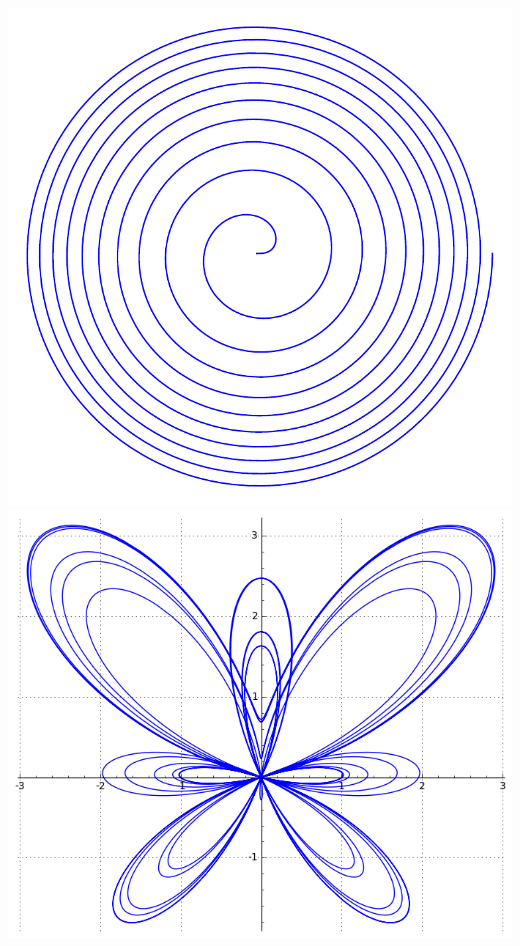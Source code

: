 \documentclass[class=report,crop=false]{standalone}
\begin{document}
\begin{center}
\includegraphics[scale=0.5]{figures/fermat_spiral}\quad
\includegraphics[scale=0.4]{figures/butterfly_curve}  
\end{center}
\end{document}
